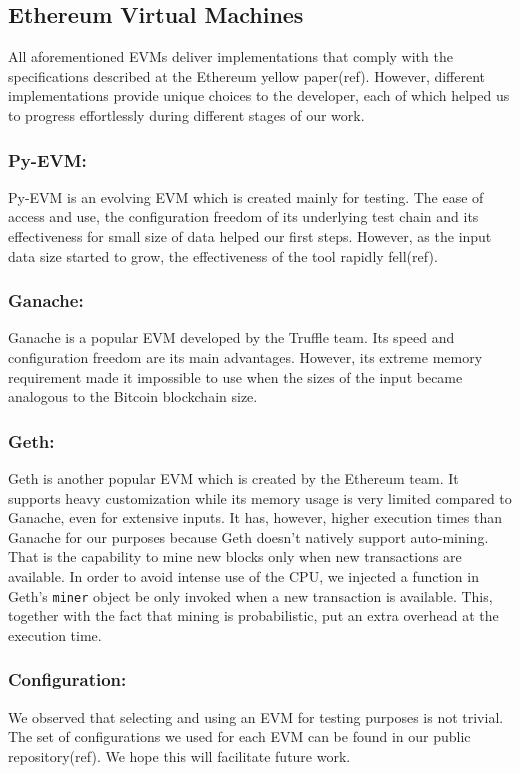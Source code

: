 \subsection{Ethereum Virtual Machines}

All aforementioned EVMs deliver implementations that comply with the
specifications described at the Ethereum yellow paper(ref). However, different
implementations provide unique choices to the developer, each of which helped
us to progress effortlessly during different stages of our work.

\subsubsection {Py-EVM:} Py-EVM is an evolving EVM which is created mainly for
testing. The ease of access and use, the configuration freedom of its
underlying test chain and its effectiveness for small size of data helped our
first steps. However, as the input data size started to grow, the effectiveness
of the tool rapidly fell(ref).

\subsubsection {Ganache:} Ganache is a popular EVM developed by the Truffle team.
Its speed and configuration freedom are its main advantages. However, its
extreme memory requirement made it impossible to use when the sizes of the
input became analogous to the Bitcoin blockchain size.

\subsubsection {Geth:} Geth is another popular EVM which is created by the Ethereum
team. It supports heavy customization while its memory usage is very limited
compared to Ganache, even for extensive inputs. It has, however, higher
execution times than Ganache for our purposes because Geth doesn't natively
support auto-mining. That is the capability to mine new blocks only when new
transactions are available. In order to avoid intense use of the CPU, we
injected a function in Geth's \texttt{miner} object be only invoked when a new
transaction is available.  This, together with the fact that mining is
probabilistic, put an extra overhead at the execution time.

\subsubsection {Configuration:} We observed that selecting and using an EVM for
testing purposes is not trivial. The set of configurations we used for each EVM
can be found in our public repository(ref). We hope this will facilitate future
work.

